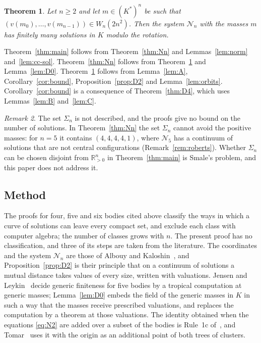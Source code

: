 \documentclass[11pt]{amsart}
\newtheorem{theorem}{Theorem}[section]
\theoremstyle{definition}
\theoremstyle{remark}
\newtheorem{remark}[theorem]{Remark}
\numberwithin{equation}{section}
\newcommand{\RR}{\mathbb{R}}
\newcommand{\cN}{\mathcal{N}}
\begin{document}
\begin{theorem}\label{thm:K}
Let $n \ge 2$ and let $m \in (K^{*})^n$ be such that $(v(m_0), \dots, v(m_{n-1})) \in W_n(2n^2)$. Then the
system $\cN_n$ with the masses $m$ has finitely many solutions in $K$ modulo the rotation.
\end{theorem}

Theorem~\ref{thm:main} follows from Theorem~\ref{thm:Nn} and Lemmas~\ref{lem:norm}
and~\ref{lem:cc-sol}. Theorem~\ref{thm:Nn} follows from Theorem~\ref{thm:K} and
Lemma~\ref{lem:D0}. Theorem~\ref{thm:K} follows from Lemma~\ref{lem:A}, Corollary~\ref{cor:bound},
Proposition~\ref{prop:D2} and Lemma~\ref{lem:orbits}. Corollary~\ref{cor:bound} is a consequence of
Theorem~\ref{thm:D4}, which uses Lemmas~\ref{lem:B} and~\ref{lem:C}.

\begin{remark}\label{rem:scope}
The set $\Sigma_n$ is not described, and the proofs give no bound on the number of solutions. In
Theorem~\ref{thm:Nn} the set $\Sigma_n$ cannot avoid the positive masses: for $n = 5$ it contains
$(4, 4, 4, 4, 1)$, where $\cN_5$ has a continuum of solutions that are not central configurations
(Remark~\ref{rem:roberts}). Whether $\Sigma_n$ can be chosen disjoint from $\RR_{>0}^n$ in
Theorem~\ref{thm:main} is Smale's problem, and this paper does not address it.
\end{remark}

\subsection*{Method} The proofs for four, five and six bodies cited above classify the ways in which a
curve of solutions can leave every compact set, and exclude each class with computer algebra; the number
of classes grows with $n$. The present proof has no classification, and three of its steps are taken from the
literature. The coordinates and the system $\cN_n$ are those of Albouy and
Kaloshin~\cite{albouykaloshin2012}, and Proposition~\ref{prop:D2} is their principle that on a continuum
of solutions a mutual distance takes values of every size, written with valuations. Jensen and
Leykin~\cite{jensenleykin2025} decide generic finiteness for five bodies by a tropical computation at
generic masses; Lemma~\ref{lem:D0} embeds the field of the generic masses in $K$ in such a way that the
masses receive prescribed valuations, and replaces the computation by a theorem at those valuations. The
identity obtained when the equations \eqref{eq:N2} are added over a subset of the bodies is Rule~1c
of~\cite{albouykaloshin2012}, and Tomar~\cite[\S 4.1 and \S 9]{tomar6} uses it with the origin as an
additional point of both trees of clusters.
\end{document}
